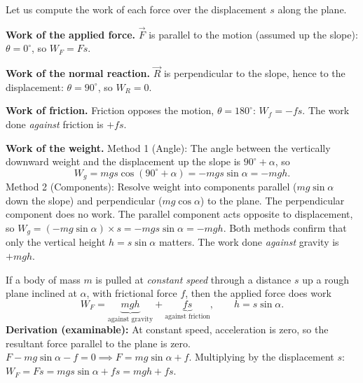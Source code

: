 \documentclass[11pt]{article}
\begin{document}
Let us compute the work of each force over the displacement $s$ along the plane.

\textbf{Work of the applied force.} $\vec{F}$ is parallel to the motion (assumed up the slope): $\theta = 0^\circ$, so $W_F = Fs$.

\textbf{Work of the normal reaction.} $\vec{R}$ is perpendicular to the slope, hence to the displacement: $\theta = 90^\circ$, so $W_R = 0$.

\textbf{Work of friction.} Friction opposes the motion, $\theta = 180^\circ$: $W_f = -fs$. The work done \emph{against} friction is $+fs$.

\textbf{Work of the weight.} 
Method 1 (Angle): The angle between the vertically downward weight and the displacement up the slope is $90^\circ + \alpha$, so
\[
W_g = mgs\cos(90^\circ + \alpha) = -mgs\sin\alpha = -mgh.
\]
Method 2 (Components): Resolve weight into components parallel ($mg\sin\alpha$ down the slope) and perpendicular ($mg\cos\alpha$) to the plane. The perpendicular component does no work. The parallel component acts opposite to displacement, so $W_g = (-mg\sin\alpha) \times s = -mgs\sin\alpha = -mgh$.
Both methods confirm that only the vertical height $h = s\sin\alpha$ matters. The work done \emph{against} gravity is $+mgh$.

\begin{propriete}
If a body of mass $m$ is pulled at \emph{constant speed} through a distance $s$ up a rough plane inclined at $\alpha$, with frictional force $f$, then the applied force does work
\[
W_F = \underbrace{mgh}_{\text{against gravity}} + \underbrace{fs}_{\text{against friction}}, \qquad h = s\sin\alpha.
\]
\textbf{Derivation (examinable):} At constant speed, acceleration is zero, so the resultant force parallel to the plane is zero. 
$F - mg\sin\alpha - f = 0 \implies F = mg\sin\alpha + f$.
Multiplying by the displacement $s$:
$W_F = Fs = mg s\sin\alpha + fs = mgh + fs$.
\end{propriete}
\end{document}
